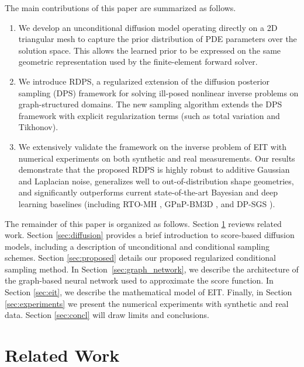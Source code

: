 \documentclass[a4paper,11pt]{article}
\theoremstyle{definition}
\theoremstyle{plain}
\theoremstyle{remark}
\begin{document}
The main contributions of this paper are summarized as follows.
\begin{enumerate}
    \item We develop an unconditional diffusion model operating directly on a 2D triangular mesh to capture the prior distribution of PDE parameters over the solution space. This allows the learned prior to be expressed on the same geometric representation used by the finite-element forward solver.
    \item We introduce RDPS, a regularized extension of the diffusion posterior sampling (DPS) framework for solving ill-posed nonlinear inverse problems on graph-structured domains. 
    The new sampling algorithm extends the DPS framework with explicit regularization terms (such as total variation and Tikhonov).
    \item We extensively validate the framework on the inverse problem of EIT with numerical experiments on both synthetic and real measurements. Our results demonstrate that the proposed RDPS is highly robust to additive Gaussian and Laplacian noise, generalizes well to out-of-distribution shape geometries, and significantly outperforms current state-of-the-art Bayesian and deep learning baselines (including RTO-MH \cite{bardsley2015randomize}, GPnP-BM3D \cite{bouman2023generative}, and DP-SGS \cite{ling2025split}). 
\end{enumerate}

The remainder of this paper is organized as follows. Section \ref{sec:related} reviews related work. Section \ref{sec:diffusion} provides a brief introduction to score-based diffusion models, including a description of unconditional and conditional sampling schemes. Section \ref{sec:proposed} details our proposed regularized conditional sampling method. In Section~\ref{sec:graph_network}, we describe the architecture of the graph-based neural network used to approximate the score function. In Section \ref{sec:eit}, we describe the mathematical model of EIT. Finally, in Section \ref{sec:experiments} we present the numerical experiments with synthetic and real data. Section \ref{sec:concl} will draw limits and conclusions.

\section{Related Work}
\label{sec:related}
\end{document}
